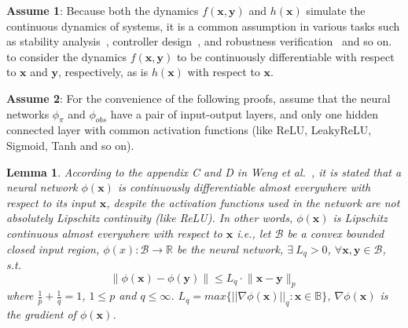 \documentclass[conference]{IEEEtran}
\newtheorem{lemma}{\bf Lemma}
\newcommand{\nncs}{\textsc{NNCS}\xspace}
\newcommand{\myvec}[1]{\boldsymbol{#1}}
\newcommand{\relu}{ReLU\xspace}
\newcommand{\calB}{\mathcal{B}}
\newcommand{\bbB}{\mathbb{B}}
\newcommand{\bbR}{\mathbb{R}}
\newcommand{\bbN}{\mathbb{N}}
\begin{document}
\textbf{Assume 1}: 
Because both the dynamics $f(\myvec{x}, \myvec{y})$ 
and $h(\myvec{x})$ simulate the continuous dynamics of systems, 
it is a common assumption in various tasks such as 
stability analysis~\cite{chakraborty2011nonlinear,chen2014stability}, 
controller design~\cite{korda2014controller,mauroy2016global}, 
and robustness verification~\cite{wu2023neural,yanglyapunov} and so on. 
to consider the dynamics $f(\myvec{x}, \myvec{y})$ to be continuously 
differentiable with respect to $\myvec{x}$ and $\myvec{y}$, respectively, 
as is $h(\myvec{x})$ with respect to $\myvec{x}$.

\textbf{Assume 2}: 
For the convenience of the following proofs, 
assume that the neural networks $\phi_{\pi}$ and 
$\phi_{obs}$ have a pair of input-output layers, and 
only one hidden connected layer with common activation 
functions (like \relu, Leaky\relu, Sigmoid, Tanh and so on). 

\begin{lemma}\label{lemma:CLEVER}
  According to the appendix C and D in 
  Weng et al.~\cite{weng2018evaluating}, 
  it is stated that a neural network $\phi(\myvec{x})$ 
  is continuously differentiable almost everywhere 
  with respect to its input $\myvec{x}$, 
  despite the activation functions used in the network 
  are not absolutely Lipschitz continuity (like \relu). 
  In other words, $\phi(\myvec{x})$ is Lipschitz continuous 
  almost everywhere with respect to $\myvec{x}$ i.e., 
  let $\calB$ be a convex bounded closed input region, 
  $\phi(x):\calB \to \bbR$ be the neural network, 
  $\exists \ L_{q} > 0$, $\forall \myvec{x}, \myvec{y} \in \calB$, s.t.
  \begin{equation}
    \lVert \phi(\myvec{x}) - \phi(\myvec{y}) \rVert \leq
    L_{q}\cdot \lVert \myvec{x} - \myvec{y} \rVert_{p}
  \end{equation}
  where $\frac{1}{p} + \frac{1}{q} = 1$, $1 \leq p$ and $q \leq \infty$. 
  $L_{q} = max\{ || \nabla \phi(\myvec{x}) ||_{q}: \myvec{x} \in \bbB\}$, 
  $\nabla \phi(\myvec{x})$ is the gradient of $\phi(\myvec{x})$. 
\end{lemma}
\end{document}
